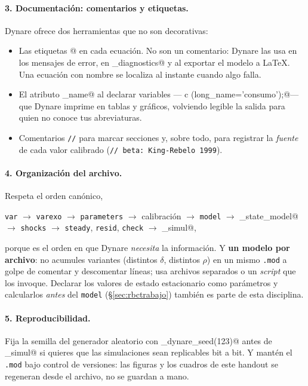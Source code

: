 \documentclass[11pt,a4paper]{report}
\newcommand{\code}[1]{\texttt{#1}}
\begin{document}
\paragraph{3. Documentación: comentarios y etiquetas.} Dynare ofrece dos
herramientas que no son decorativas:
\begin{itemize}[leftmargin=1.4em, topsep=2pt, itemsep=3pt]
\item Las etiquetas \lstinline@[name='...']@ en cada ecuación. No son un comentario:
  Dynare las usa en los mensajes de error, en \lstinline@model_diagnostics@ y al
  exportar el modelo a \LaTeX. Una ecuación con nombre se localiza al instante
  cuando algo falla.
\item El atributo \lstinline@long_name@ al declarar variables ---
  \lstinline@var c (long_name='consumo');@--- que Dynare imprime en tablas y
  gráficos, volviendo legible la salida para quien no conoce tus abreviaturas.
\item Comentarios \code{//} para marcar secciones y, sobre todo, para registrar
  la \emph{fuente} de cada valor calibrado (\code{// beta: King-Rebelo 1999}).
\end{itemize}

\paragraph{4. Organización del archivo.} Respeta el orden canónico,
\begin{center}\small
\code{var} $\to$ \code{varexo} $\to$ \code{parameters} $\to$ calibración $\to$
\code{model} $\to$ \lstinline@steady_state_model@ $\to$ \code{shocks} $\to$
\code{steady}, \code{resid}, \code{check} $\to$ \lstinline@stoch_simul@,
\end{center}
porque es el orden en que Dynare \emph{necesita} la información. Y \textbf{un modelo por archivo}: no
acumules variantes (distintos $\delta$, distintos $\rho$) en un mismo \code{.mod} a
golpe de comentar y descomentar líneas; usa archivos separados o un \emph{script}
que los invoque. Declarar los valores de estado estacionario como parámetros y
calcularlos \emph{antes} del \code{model} (\S\ref{sec:rbctrabajo}) también es parte
de esta disciplina.

\paragraph{5. Reproducibilidad.} Fija la semilla del generador aleatorio con
\lstinline@set_dynare_seed(123)@ antes de \lstinline@stoch_simul@ si quieres que las
simulaciones sean replicables bit a bit. Y mantén el \code{.mod} bajo control de
versiones: las figuras y los cuadros de este handout se regeneran desde el archivo,
no se guardan a mano.
\end{document}
